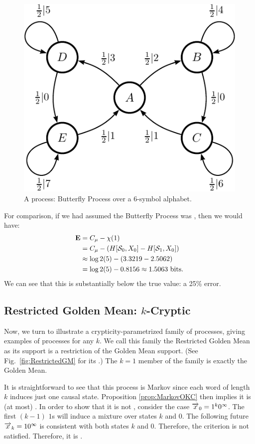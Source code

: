 \begin{figure}[th]
\centering
\includegraphics{../chapter3/figures/butterfly}
\caption{A  process: Butterfly Process over a $6$-symbol alphabet.}
\label{fig:ButterflyProcess}
\end{figure}
For comparison, if we had assumed the Butterfly Process was , then
we would have:
\begin{align*}
{\bf E} & = C_\mu - \chi(1) \\
  & = C_\mu - (H[\mathcal{S}_0, {X}_0]
	- H[\mathcal{S}_1, {X}_0]) \\
  & \approx \log2(5) - (3.3219 - 2.5062) \\
  & = \log2(5) - 0.8156 \approx 1.5063 ~\mathrm{bits}.
\end{align*}
We can see that this is substantially below the true value: a 25\% error.

\subsection{Restricted Golden Mean: $k$-Cryptic}

Now, we turn to illustrate a crypticity-parametrized family of processes,
giving examples of  processes for any $k$. We call this family the
Restricted Golden Mean as its support is a restriction of the Golden Mean
support. (See Fig.~\ref{fig:RestrictedGM} for its \eMs.)
The $k=1$ member of the family is exactly the Golden Mean.

It is straightforward to see that this process is  Markov since
each word of length $k$ induces just one causal state. Proposition
\ref{prop:MarkovOKC} then implies it is (at most) . In order to show
that it is not , consider the case $\smash{\overrightarrow{{x}}}_0 = 1^{k}0^\infty$.
The first $(k-1)$ $1$s will induce a mixture over states $k$ and $0$. The
following future $\smash{\overrightarrow{{x}}}_k = 10^\infty$ is consistent with both states $k$
and $0$. Therefore, the  criterion is not satisfied.
Therefore, it is .

